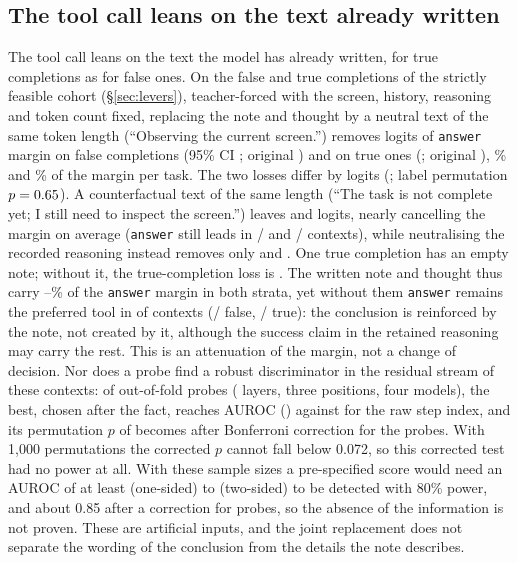 \subsection{The tool call leans on the text already written}
\label{sec:anchor}
The tool call leans on the text the model has already written, for true completions as for false ones. On the \paFsN{} false and \paTrueN{} true completions of the strictly feasible cohort (\S\ref{sec:levers}), teacher-forced with the screen, history, reasoning and token count fixed, replacing the note and thought by a neutral text of the same token length (``Observing the current screen.'') removes \paNeutralFs{} logits of \texttt{answer} margin on false completions (95\% CI \paNeutralFsCi; original \paOrigFs) and \paNeutralTrue{} on true ones (\paNeutralTrueCi; original \paOrigTrue), \paFracFs\% and \paFracTrue\% of the margin per task. The two losses differ by \paInter{} logits (\paInterCi; label permutation $p=0.65$). A counterfactual text of the same length (``The task is not complete yet; I still need to inspect the screen.'') leaves \paCounterLeftFs{} and \paCounterLeftTrue{} logits, nearly cancelling the margin on average (\texttt{answer} still leads in \paCounterPosFs/\paFsN{} and \paCounterPosTrue/\paTrueN{} contexts), while neutralising the recorded reasoning instead removes only \paReasonFs{} and \paReasonTrue. %
One true completion has an empty note; without it, the true-completion loss is \paNeutralTrueSens. The written note and thought thus carry \paFracTrue--\paFracFs\% of the \texttt{answer} margin in both strata, yet without them \texttt{answer} remains the preferred tool in \paNeutralPosAll{} of \paN{} contexts (\paNeutralPosFs/\paFsN{} false, \paNeutralPosTrue/\paTrueN{} true): the conclusion is reinforced by the note, not created by it, although the success claim in the retained reasoning may carry the rest. This is an attenuation of the margin, not a change of decision. Nor does a probe find a robust discriminator in the residual stream of these contexts: of \paNProbes{} out-of-fold probes (\paNLayers{} layers, three positions, four models), the best, chosen after the fact, reaches AUROC \paBestAuc{} (\paBestCi) against \paStepAuc{} for the raw step index, and its permutation $p$ of \paPermP{} becomes \paPermPadj{} after Bonferroni correction for the \paNProbes{} probes. With 1{,}000 permutations the corrected $p$ cannot fall below 0.072, so this corrected test had no power at all. With these sample sizes a pre-specified score would need an AUROC of at least \paPowOne{} (one-sided) to \paPowTwo{} (two-sided) to be detected with 80\% power, and about 0.85 after a correction for \paNProbes{} probes, %
 so the absence of the information is not proven. These are artificial inputs, and the joint replacement does not separate the wording of the conclusion from the details the note describes.

